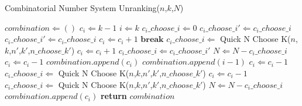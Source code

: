 \begin{algorithm}[H]
  \caption{Combinatorial Number System Unranking($n$,$k$,$N$)}  \label{alg:CNS}
  \begin{algorithmic}[1]
  \State $\mathit{combination} \Longleftarrow ()$
  \State $\mathit{c_i} \Longleftarrow k-1$
  \State $i \Longleftarrow k$
  \State $\mathit{c_{i}\_choose\_i} \Longleftarrow 0$
  \State $\mathit{c_{i}\_choose\_i'} \Longleftarrow \mathit{c_{i}\_choose\_i}$
    \State $\mathit{c_{i}\_choose\_i'} \Longleftarrow \mathit{c_{i}\_choose\_i}$
        \State $c_i \Longleftarrow c_i + 1$
        \State $\mathbf{break}$
    \EndIf
    \State $\mathit{c_{i}\_choose\_i} \Longleftarrow$ Quick N Choose K($n$,$k$,$n'$,$k'$,$\mathit{n\_choose\_k'}$) \label{alg:CNS:quick1}
  \State $c_i \Longleftarrow c_i + 1$ 
  \EndWhile
  \State $\mathit{c_{i}\_choose\_i} \Longleftarrow \mathit{c_{i}\_choose\_i'}$
  \State $N \Longleftarrow N - \mathit{c_{i}\_choose\_i}$
  \State $c_i \Longleftarrow c_i - 1$
  \State $\mathit{combination}.\mathit{append}(c_i)$
  \State $\mathit{combination}.\mathit{append}(i - 1)$
  \Else
  \State $c_i \Longleftarrow c_i - 1$
  \State $\mathit{c_{i}\_choose\_i} \Longleftarrow$ Quick N Choose K($n$,$k$,$n'$,$k'$,$\mathit{n\_choose\_k'}$) \label{alg:CNS:quick2}
  \State $c_i \Longleftarrow c_i - 1$
  \State $\mathit{c_{i}\_choose\_i} \Longleftarrow$ Quick N Choose K($n$,$k$,$n'$,$k'$,$\mathit{n\_choose\_k'}$) \label{alg:CNS:quick3}
  \EndWhile
  \State $N \Longleftarrow N - \mathit{c_{i}\_choose\_i}$
  \State $\mathit{combination}.\mathit{append}(c_i)$
  \EndIf
  \EndFor
  \State \textbf{return} $\mathit{combination}$
  \end{algorithmic}
\end{algorithm}


